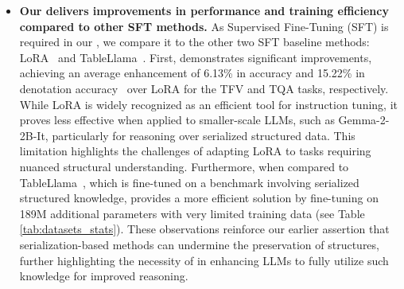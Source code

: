 {\begin{itemize}[leftmargin=*]
\item \textbf{Our \name delivers improvements in performance and training efficiency compared to other SFT methods.} As Supervised Fine-Tuning (SFT) is required in our \name, we compare it to the other two SFT baseline methods: LoRA~\cite{hu2022lora} and TableLlama~\cite{zhang2024tablellama}. First, \name demonstrates significant improvements, achieving an average enhancement of 6.13\% in accuracy and 15.22\% in denotation accuracy~\cite{deacc} over LoRA for the TFV and TQA tasks, respectively.  While LoRA is widely recognized as an efficient tool for instruction tuning, it proves less effective when applied to smaller-scale LLMs, such as Gemma-2-2B-It, particularly for reasoning over serialized structured data. This limitation highlights the challenges of adapting LoRA to tasks requiring nuanced structural understanding. Furthermore, when compared to TableLlama~\cite{zhang2024tablellama}, which is fine-tuned on a benchmark involving serialized structured knowledge, \name provides a more efficient solution by fine-tuning on 189M additional parameters with very limited training data (see Table \ref{tab:datasets_stats}). These observations reinforce our earlier assertion that serialization-based methods can undermine the preservation of structures, further highlighting the necessity of \name in enhancing LLMs to fully utilize such knowledge for improved reasoning.
   

\end{itemize}


}
